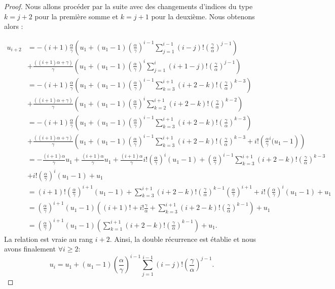 \documentclass[12pt,a4paper]{report}
\theoremstyle{remark}
\begin{document}
\begin{proof}
Nous allons procéder par la suite avec des changements d'indices du type $k=j+2$ pour la première somme et $k=j+1$ pour la deuxième. Nous obtenons alors :

\begin{align*}
u_{i+2} &= -(i+1) \frac{\alpha}{\gamma} \left(u_1 + (u_1 - 1)\left(\frac{\alpha}{\gamma}\right)^{i-1} \sum_{j=1}^{i-1}(i-j)!\left(\frac{\gamma}{\alpha}\right)^{j-1}\right) \\
&+ \frac{((i+1) \alpha + \gamma)}{\gamma} \left(u_1 + (u_1 - 1)\left(\frac{\alpha}{\gamma}\right)^{i} \sum_{j=1}^{i}(i+1-j)!\left(\frac{\gamma}{\alpha}\right)^{j-1}\right) \\
&= -(i+1) \frac{\alpha}{\gamma} \left(u_1 + (u_1 - 1)\left(\frac{\alpha}{\gamma}\right)^{i-1} \sum_{k=3}^{i+1}(i+2-k)!\left(\frac{\gamma}{\alpha}\right)^{k-3}\right) \\
&+ \frac{((i+1) \alpha + \gamma)}{\gamma} \left(u_1 + (u_1 - 1)\left(\frac{\alpha}{\gamma}\right)^{i} \sum_{k=2}^{i+1}(i+2-k)!\left(\frac{\gamma}{\alpha}\right)^{k-2}\right) \\
&= -(i+1) \frac{\alpha}{\gamma} \left(u_1 + (u_1 - 1)\left(\frac{\alpha}{\gamma}\right)^{i-1} \sum_{k=3}^{i+1}(i+2-k)!\left(\frac{\gamma}{\alpha}\right)^{k-3}\right) \\
&+ \frac{((i+1) \alpha + \gamma)}{\gamma} \left(u_1 + (u_1 - 1)\left(\frac{\alpha}{\gamma}\right)^{i-1} \sum_{k=3}^{i+1}(i+2-k)!\left(\frac{\gamma}{\alpha}\right)^{k-3} + i! \left(\frac{\alpha}{\gamma}^i(u_1 - 1\right)\right) \\
&= -\frac{(i+1)\alpha}{\gamma} u_1 + \frac{(i+1)\alpha}{\gamma} u_1 + \frac{(i+1)\alpha}{\gamma} i! \left(\frac{\alpha}{\gamma}\right)^i (u_1 - 1) + \left(\frac{\alpha}{\gamma}\right)^{i-1} \sum_{k=3}^{i+1}(i+2-k)!\left(\frac{\gamma}{\alpha}\right)^{k-3} \\
&+ i! \left(\frac{\alpha}{\gamma}\right)^i (u_1 - 1) + u_1 \\
&= (i+1)! \left(\frac{\alpha}{\gamma}\right)^{i+1} (u_1 - 1) + \sum_{k=3}^{i+1}(i+2-k)!\left(\frac{\gamma}{\alpha}\right)^{k-1} \left(\frac{\alpha}{\gamma}\right)^{i+1} + i! \left(\frac{\alpha}{\gamma}\right)^i (u_1 - 1) + u_1 \\
&= \left(\frac{\alpha}{\gamma}\right)^{i+1} (u_1 - 1) \left((i+1)! + i! \frac{\gamma}{\alpha} + \sum_{k=3}^{i+1}(i+2-k)!\left(\frac{\gamma}{\alpha}\right)^{k-1} \right) + u_1 \\
&= \left(\frac{\alpha}{\gamma}\right)^{i+1} (u_1 - 1) \left(\sum_{k=1}^{i+1}(i+2-k)!\left(\frac{\gamma}{\alpha}\right)^{k-1} \right) + u_1.
\end{align*}
La relation est vraie au rang $i+2$. Ainsi, la double récurrence est établie et nous avons finalement $\forall i \geqslant 2$:
$$u_i = u_1 + (u_1 - 1)\left(\frac{\alpha}{\gamma}\right)^{i-1} \sum_{j=1}^{i-1}(i-j)!\left(\frac{\gamma}{\alpha}\right)^{j-1}.$$


\end{proof}
\end{document}
